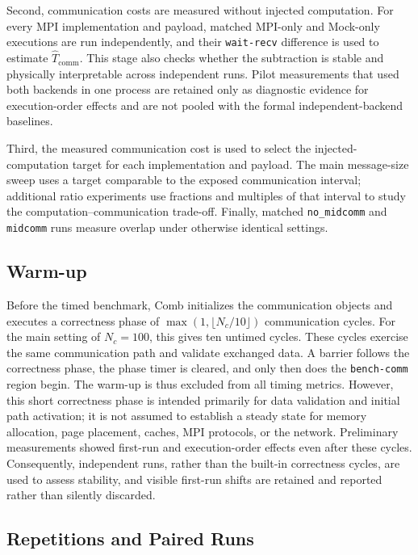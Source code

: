 Second, communication costs are measured without injected computation.
For every MPI implementation and payload, matched MPI-only and Mock-only
executions are run independently, and their \texttt{wait-recv} difference is
used to estimate $\widehat{T}_{\mathrm{comm}}$. This stage also checks whether
the subtraction is stable and physically interpretable across independent
runs. Pilot measurements that used both backends in one process are retained
only as diagnostic evidence for execution-order effects and are not pooled
with the formal independent-backend baselines.

Third, the measured communication cost is used to select the injected-computation target
for each implementation and payload. The main message-size sweep uses a target
comparable to the exposed communication interval; additional ratio experiments
use fractions and multiples of that interval to study the
computation--communication trade-off. Finally, matched \texttt{no\_midcomm} and
\texttt{midcomm} runs measure overlap under otherwise identical settings.


\subsection{Warm-up}

Before the timed benchmark, Comb initializes the communication objects and
executes a correctness phase of
$\max(1,\lfloor N_c/10\rfloor)$ communication cycles. For the main setting of
$N_c=100$, this gives ten untimed cycles. These cycles exercise the same
communication path and validate exchanged data. A barrier follows the
correctness phase, the phase timer is cleared, and only then does the
\texttt{bench-comm} region begin. The warm-up is thus excluded from all timing
metrics. However, this short correctness phase is intended primarily for data
validation and initial path activation; it is not assumed to establish a
steady state for memory allocation, page placement, caches, MPI protocols, or
the network. Preliminary measurements showed first-run and execution-order
effects even after these cycles. Consequently, independent runs, rather than
the built-in correctness cycles, are used to assess stability, and visible
first-run shifts are retained and reported rather than silently discarded.

\subsection{Repetitions and Paired Runs}

